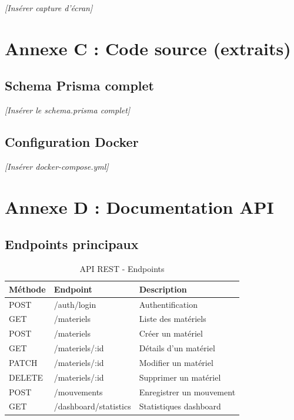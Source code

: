 \textit{[Insérer capture d'écran]}

\section{Annexe C : Code source (extraits)}

\subsection{Schema Prisma complet}

\textit{[Insérer le schema.prisma complet]}

\subsection{Configuration Docker}

\textit{[Insérer docker-compose.yml]}

\section{Annexe D : Documentation API}

\subsection{Endpoints principaux}

\begin{table}[H]
\centering
\caption{API REST - Endpoints}
\begin{tabularx}{\textwidth}{|l|l|X|}
\hline
\textbf{Méthode} & \textbf{Endpoint} & \textbf{Description} \\
\hline
POST & /auth/login & Authentification \\
\hline
GET & /materiels & Liste des matériels \\
\hline
POST & /materiels & Créer un matériel \\
\hline
GET & /materiels/:id & Détails d'un matériel \\
\hline
PATCH & /materiels/:id & Modifier un matériel \\
\hline
DELETE & /materiels/:id & Supprimer un matériel \\
\hline
POST & /mouvements & Enregistrer un mouvement \\
\hline
GET & /dashboard/statistics & Statistiques dashboard \\
\hline
\end{tabularx}
\end{table}

